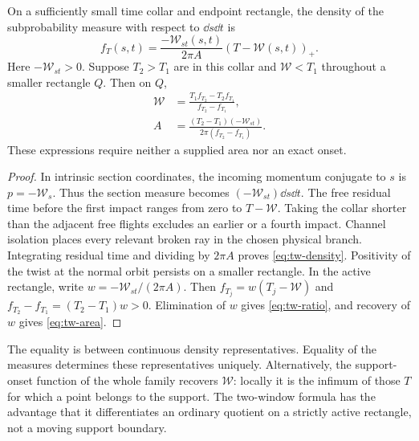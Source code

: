 \begin{lemma}
\label{lem:tw-affine}
On a sufficiently small time collar and endpoint rectangle, the density
of the subprobability measure with respect to $\dd s\dd t$ is
\begin{equation}\label{eq:tw-density}
 f_T(s,t)=\frac{-\mathcal W_{st}(s,t)}{2\pi A}
                         (T-\mathcal W(s,t))_+.
\end{equation}
Here $-\mathcal W_{st}>0$. Suppose $T_2>T_1$ are in this collar and
$\mathcal W<T_1$ throughout a smaller rectangle $Q$. Then on $Q$,
\begin{align}
 \mathcal W&=\frac{T_1f_{T_2}-T_2f_{T_1}}{f_{T_2}-f_{T_1}},
                                                   \label{eq:tw-ratio}\\
 A&=\frac{(T_2-T_1)(-\mathcal W_{st})}
                         {2\pi(f_{T_2}-f_{T_1})}.  \label{eq:tw-area}
\end{align}
These expressions require neither a supplied area nor an exact onset.
\end{lemma}
\begin{proof}
In intrinsic section coordinates, the incoming momentum conjugate to
$s$ is $p=-\mathcal W_s$. Thus the section measure becomes
$(-\mathcal W_{st})\dd s\dd t$. The free residual time before the
first impact ranges from zero to $T-\mathcal W$. Taking the collar
shorter than the adjacent free flights excludes an earlier or a fourth
impact. Channel isolation places every relevant broken ray in the
chosen physical branch. Integrating residual time and dividing by
$2\pi A$ proves \eqref{eq:tw-density}. Positivity of the twist at the
normal orbit persists on a smaller rectangle. In the active rectangle,
write $w=-\mathcal W_{st}/(2\pi A)$. Then
$f_{T_j}=w(T_j-\mathcal W)$ and
$f_{T_2}-f_{T_1}=(T_2-T_1)w>0$. Elimination of $w$ gives
\eqref{eq:tw-ratio}, and recovery of $w$ gives \eqref{eq:tw-area}.
\end{proof}

The equality is between continuous density representatives. Equality of
the measures determines these representatives uniquely. Alternatively,
the support-onset function of the whole family recovers $\mathcal W$:
locally it is the infimum of those $T$ for which a point belongs to the
support. The two-window formula has the advantage that it differentiates
an ordinary quotient on a strictly active rectangle, not a moving
support boundary.

